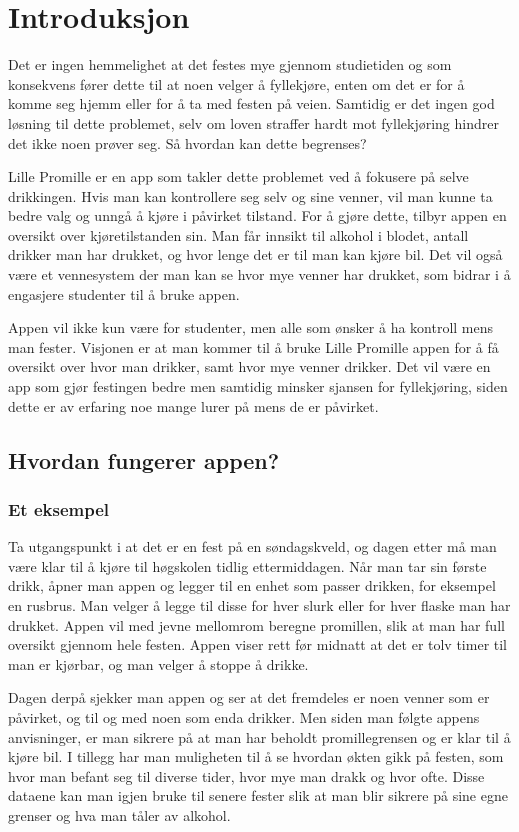 \section{Introduksjon}
Det er ingen hemmelighet at det festes mye gjennom studietiden og som konsekvens fører dette til at noen velger å fyllekjøre, enten om det er for å komme seg hjemm eller for å ta med festen på veien. Samtidig er det ingen god løsning til dette problemet, selv om loven straffer hardt mot fyllekjøring hindrer det ikke noen prøver seg. Så hvordan kan dette begrenses?

Lille Promille er en app som takler dette problemet ved å fokusere på selve drikkingen. Hvis man kan kontrollere seg selv og sine venner, vil man kunne ta bedre valg og unngå å kjøre i påvirket tilstand. For å gjøre dette, tilbyr appen en oversikt over kjøretilstanden sin. Man får innsikt til alkohol i blodet, antall drikker man har drukket, og hvor lenge det er til man kan kjøre bil. Det vil også være et vennesystem der man kan se hvor mye venner har drukket, som bidrar i å engasjere studenter til å bruke appen.

Appen vil ikke kun være for studenter, men alle som ønsker å ha kontroll mens man fester. Visjonen er at man kommer til å bruke Lille Promille appen for å få oversikt over hvor man drikker, samt hvor mye venner drikker. Det vil være en app som gjør festingen bedre men samtidig minsker sjansen for fyllekjøring, siden dette er av erfaring noe mange lurer på mens de er påvirket.

\subsection{Hvordan fungerer appen?}
\subsubsection{Et eksempel}
Ta utgangspunkt i at det er en fest på en søndagskveld, og dagen etter må man være klar til å kjøre til høgskolen tidlig ettermiddagen. Når man tar sin første drikk, åpner man appen og legger til en enhet som passer drikken, for eksempel en rusbrus. Man velger å legge til disse for hver slurk eller for hver flaske man har drukket. Appen vil med jevne mellomrom beregne promillen, slik at man har full oversikt gjennom hele festen. Appen viser rett før midnatt at det er tolv timer til man er kjørbar, og man velger å stoppe å drikke.

Dagen derpå sjekker man appen og ser at det fremdeles er noen venner som er påvirket, og til og med noen som enda drikker. Men siden man følgte appens anvisninger, er man sikrere på at man har beholdt promillegrensen og er klar til å kjøre bil. I tillegg har man muligheten til å se hvordan økten gikk på festen, som hvor man befant seg til diverse tider, hvor mye man drakk og hvor ofte. Disse dataene kan man igjen bruke til senere fester slik at man blir sikrere på sine egne grenser og hva man tåler av alkohol.

